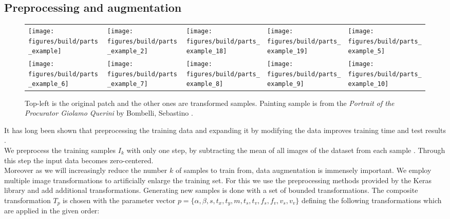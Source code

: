 \subsection{Preprocessing and augmentation}
\label{sec:pipeline:training:augment}
\begin{figure}[htb]
    \begin{tabularx}{\textwidth}{XXXXX}
        \texttt{[image: figures/build/parts\_example]} &
        \texttt{[image: figures/build/parts\_example\_2]} &
        \texttt{[image: figures/build/parts\_example\_18]} &
        \texttt{[image: figures/build/parts\_example\_19]} &
        \texttt{[image: figures/build/parts\_example\_5]} \\

        \texttt{[image: figures/build/parts\_example\_6]} &
        \texttt{[image: figures/build/parts\_example\_7]} &
        \texttt{[image: figures/build/parts\_example\_8]} &
        \texttt{[image: figures/build/parts\_example\_9]} &
        \texttt{[image: figures/build/parts\_example\_10]}
    \end{tabularx}
	\caption{Top-left is the original patch and the other ones are transformed samples. Painting sample is from the \textit{Portrait of the Procurator Giolamo Querini} by Bombelli, Sebastino \citep{bombelli_retrato_1669}.}
    \label{fig:augmentation}
\end{figure}
It has long been shown that preprocessing the training data and expanding it by modifying the data improves training time and test results \citep{dosovitskiy_discriminative_2014}.\\
We preprocess the training samples $I_k$ with only one step, by subtracting the mean of all images of the dataset from each sample \citep{krizhevsky_imagenet_2012}. Through this step the input data becomes zero-centered.\\
Moreover as we will increasingly reduce the number $k$ of samples to train from, data augmentation is immensely important.  We employ multiple image transformations to artificially enlarge the training set. For this we use the preprocessing methods provided by the Keras library \citep{chollet_keras:_2015} and add additional transformations. Generating new samples is done with a set of bounded transformations. The composite transformation $T_p$ is chosen with the parameter vector $p = \{\alpha, \beta, s, t_x, t_y, m, t_s, t_v, f_s, f_v, v_s, v_v\}$ defining the following transformations which are applied in the given order:
